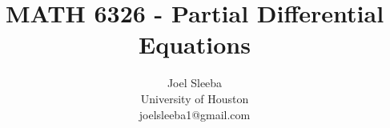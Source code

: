 \documentclass[12pt]{report}
\theoremstyle{plain} %
\theoremstyle{definition} %
\theoremstyle{remark} %
\begin{document}
    \title{MATH 6326 - Partial Differential Equations}

    \author{
      Joel Sleeba \\
      University of Houston \\
      joelsleeba1@gmail.com \\
    }

    \maketitle

     \setcounter{page}{2}
    \tableofcontents
     \setcounter{page}{1}

    
    
    

    \printbibliography[heading=bibintoc]
\end{document}
